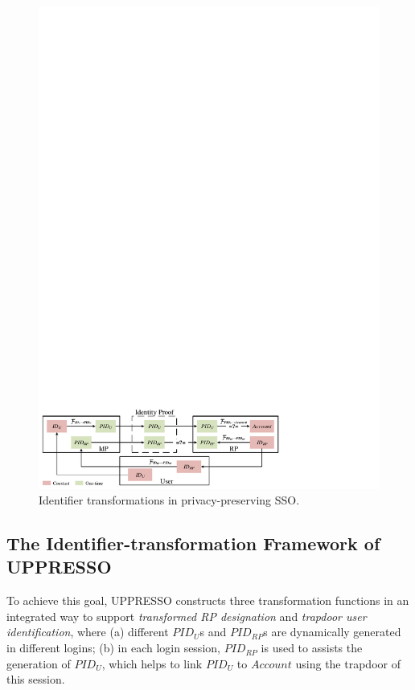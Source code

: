 \begin{figure}
  \centering
  \includegraphics[width=\linewidth]{fig/IDCorrelation.pdf}
  \caption{Identifier transformations in privacy-preserving SSO.}
  \label{fig:IDCorrelation}
  \vspace{-5mm}
\end{figure}




\subsection{The Identifier-transformation Framework of UPPRESSO}
\label{subsec:solutions}

To achieve this goal, UPPRESSO constructs three transformation functions in an integrated way to support {\em transformed RP designation} and {\em trapdoor user identification}, where (a) different $PID_U$s and $PID_{RP}$s are dynamically generated in different logins; (b) in each login session, $PID_{RP}$ is used to assists the generation of $PID_U$, which helps to link $PID_U$ to $Account$ using the trapdoor of this session.%


